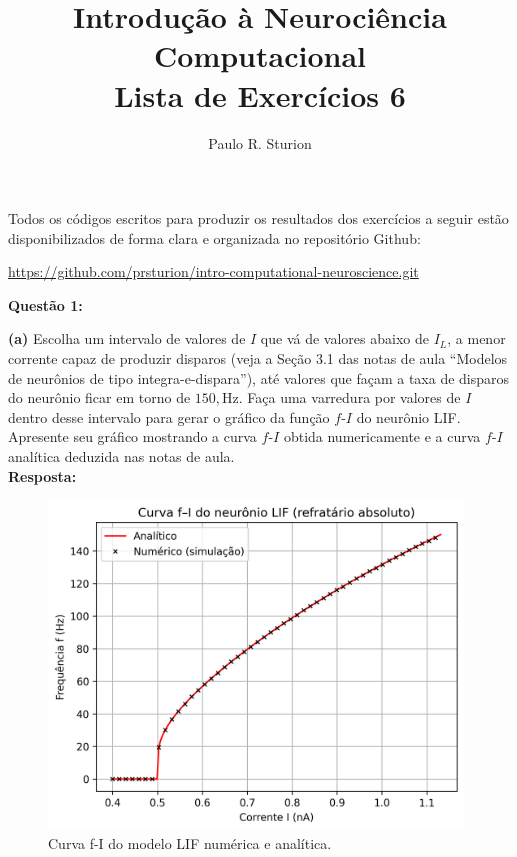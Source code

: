\documentclass[english,11pt,a4paper]{article}
\title{Introdução à Neurociência Computacional\\Lista de Exercícios 6}
\author{Paulo R. Sturion}
\begin{document}
	\maketitle
	
	\noindent Todos os códigos escritos para produzir os resultados dos exercícios a seguir estão disponibilizados de forma clara e organizada no repositório Github:
	
	\begin{center}
		\noindent \href{https://github.com/prsturion/intro-computational-neurosciene.git}{https://github.com/prsturion/intro-computational-neuroscience.git} \newline
	\end{center}
	
	\noindent\textbf{Questão 1:}
	
	\noindent \textbf{(a)} Escolha um intervalo de valores de $I$ que vá de valores abaixo de $I_L$, a menor corrente capaz de produzir disparos (veja a Seção 3.1 das notas de aula ``Modelos de neurônios de tipo integra-e-dispara''), até valores que façam a taxa de disparos do neurônio ficar em torno de $150,\text{Hz}$. Faça uma varredura por valores de $I$ dentro desse intervalo para gerar o gráfico da função $f$-$I$ do neurônio LIF. Apresente seu gráfico mostrando a curva $f$-$I$ obtida numericamente e a curva $f$-$I$ analítica deduzida nas notas de aula.\\
	
	\noindent\textbf{Resposta:}
	
	\begin{figure}[H]
		\centering
		\includegraphics[width=11cm]{../figures/ex_1a.png}
		\caption{Curva f-I do modelo LIF numérica e analítica.}
	\end{figure}
	
\end{document}
